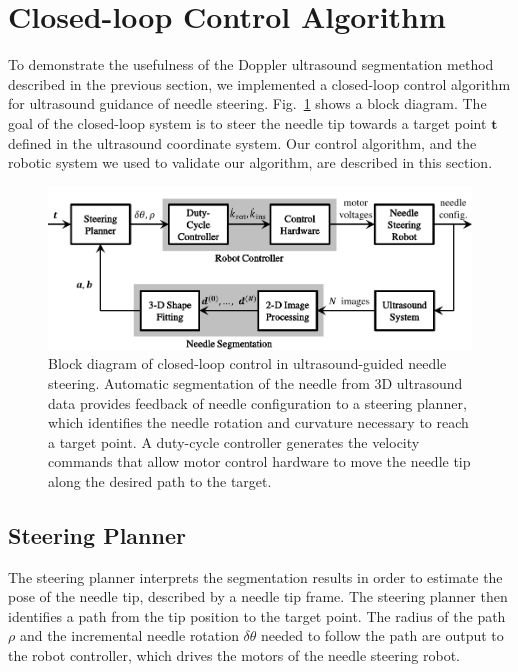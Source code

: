 \section{Closed-loop Control Algorithm}
To demonstrate the usefulness of the Doppler ultrasound segmentation method described in the previous section, we implemented a closed-loop control algorithm for ultrasound guidance of needle steering. Fig.~\ref{fig:ControlBlockDiagram} shows a block diagram. The goal of the closed-loop system is to steer the needle tip towards a target point $\bm{t}$ defined in the ultrasound coordinate system. Our control algorithm, and the robotic system we used to validate our algorithm, are described in this section. 

\begin{figure}[!t]
\centering
\includegraphics[width=0.85\columnwidth]{Images/Chapter2/ControlBlockDiagram/ControlBlockDiagram}%
\caption[Block diagram of closed-loop control algorithm]{Block diagram of closed-loop control in ultrasound-guided needle steering. Automatic segmentation of the needle from 3D ultrasound data provides feedback of needle configuration to a steering planner, which identifies the needle rotation and curvature necessary to reach a target point. A duty-cycle controller generates the velocity commands that allow motor control hardware to move the needle tip along the desired path to the target.}
\label{fig:ControlBlockDiagram}
\end{figure}

\subsection{Steering Planner}
The steering planner interprets the segmentation results in order to estimate the pose of the needle tip, described by a needle tip frame. The steering planner then identifies a path from the tip position to the target point. The radius of the path $\rho$ and the incremental needle rotation $\delta\theta$ needed to follow the path are output to the robot controller, which drives the motors of the needle steering robot.

